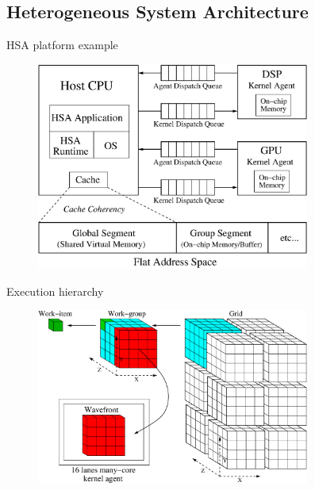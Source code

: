 \documentclass{beamer}
\begin{document}
\begin{CJK}{UTF8}{bkai}
    \section{Heterogeneous System Architecture}
    \begin{frame}{HSA platform example}
        \begin{figure}[!ht] 
            \centering
            \includegraphics[width=0.8\textwidth]{./figs/systemspec.eps}
            \label{fig:systemspec}
        \end{figure}
    \end{frame}

    \begin{frame}{Execution hierarchy}
        \begin{figure}[!ht] 
            \centering
            \includegraphics[width=0.8\textwidth]{./figs/grid.eps}
            \label{fig:grid}
        \end{figure}
    \end{frame}


\end{CJK}
\end{document}
